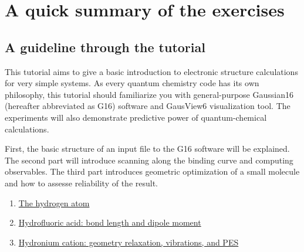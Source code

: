 	\section{A quick summary of the exercises}

	\subsection{A guideline through the tutorial}
	This tutorial aims to give a basic introduction to electronic structure calculations for very simple systems. 
	As every quantum chemistry code has its own philosophy, this tutorial should familiarize you with general-purpose Gaussian16 (hereafter abbreviated as G16) software and GausView6 visualization tool.
	The experiments will also demonstrate predictive power of quantum-chemical calculations. 	
	
	First, the basic structure of an input file to the G16 software will be explained.
	The second part will introduce scanning along the binding curve and computing observables. 
	The third part introduces geometric optimization of a small molecule and how to assesse reliability of the result. 

	\noindent
	
	  
	      \begin{enumerate}[label=Prob. \Roman*:,
	    align=left,leftmargin=*,itemindent=\parsep]
	      \item \hyperref[sec:problemI]{The hydrogen atom}
	      \item \hyperref[sec:problemII]{Hydrofluoric acid: bond length and dipole moment}	      
	      \item \hyperref[sec:problemIII]{Hydronium cation: geometry relaxation, vibrations, and PES}
	      \end{enumerate}
	   

	  
